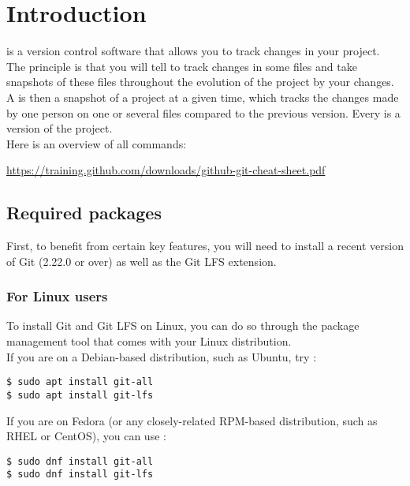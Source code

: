 \chapter{Introduction}

 is a version control software that allows you to track changes in
your project.\\

The principle is that you will tell  to track changes in some files
and take snapshots of these files throughout the evolution of the project by
 your changes. A  is then a snapshot of
a project at a given time, which tracks the changes made by one person on one 
or several files compared to the previous version. Every  is
a version of the project.\\

Here is an overview of all  commands:\\
\begin{small}
\url{https://training.github.com/downloads/github-git-cheat-sheet.pdf}
\end{small}

\section{Required packages}

First, to benefit from certain key features, you will need to install a recent
version of Git (2.22.0 or over) as well as the Git LFS extension.

\subsection{For Linux users}
To install Git and Git LFS on Linux, you can do so through the package
management tool that comes with your Linux distribution.\\

If you are on a Debian-based distribution, such as Ubuntu, try :
\begin{lstlisting}
$ sudo apt install git-all
$ sudo apt install git-lfs
\end{lstlisting}
If you are on Fedora (or any closely-related RPM-based distribution, such as
RHEL or \mbox{CentOS}), you can use :
\begin{lstlisting}
$ sudo dnf install git-all
$ sudo dnf install git-lfs
\end{lstlisting}

